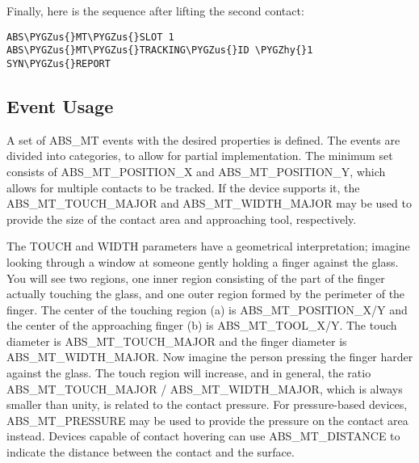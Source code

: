 \documentclass[a4paper,8pt,english]{sphinxmanual}
\def\PYGZus{\char`\_}
\def\PYGZhy{\char`\-}
\begin{document}
Finally, here is the sequence after lifting the second contact:

\begin{Verbatim}[commandchars=\\\{\}]
ABS\PYGZus{}MT\PYGZus{}SLOT 1
ABS\PYGZus{}MT\PYGZus{}TRACKING\PYGZus{}ID \PYGZhy{}1
SYN\PYGZus{}REPORT
\end{Verbatim}


\subsection{Event Usage}
\label{input/multi-touch-protocol:event-usage}
A set of ABS\_MT events with the desired properties is defined. The events
are divided into categories, to allow for partial implementation.  The
minimum set consists of ABS\_MT\_POSITION\_X and ABS\_MT\_POSITION\_Y, which
allows for multiple contacts to be tracked.  If the device supports it, the
ABS\_MT\_TOUCH\_MAJOR and ABS\_MT\_WIDTH\_MAJOR may be used to provide the size
of the contact area and approaching tool, respectively.

The TOUCH and WIDTH parameters have a geometrical interpretation; imagine
looking through a window at someone gently holding a finger against the
glass.  You will see two regions, one inner region consisting of the part
of the finger actually touching the glass, and one outer region formed by
the perimeter of the finger. The center of the touching region (a) is
ABS\_MT\_POSITION\_X/Y and the center of the approaching finger (b) is
ABS\_MT\_TOOL\_X/Y. The touch diameter is ABS\_MT\_TOUCH\_MAJOR and the finger
diameter is ABS\_MT\_WIDTH\_MAJOR. Now imagine the person pressing the finger
harder against the glass. The touch region will increase, and in general,
the ratio ABS\_MT\_TOUCH\_MAJOR / ABS\_MT\_WIDTH\_MAJOR, which is always smaller
than unity, is related to the contact pressure. For pressure-based devices,
ABS\_MT\_PRESSURE may be used to provide the pressure on the contact area
instead. Devices capable of contact hovering can use ABS\_MT\_DISTANCE to
indicate the distance between the contact and the surface.
\end{document}
